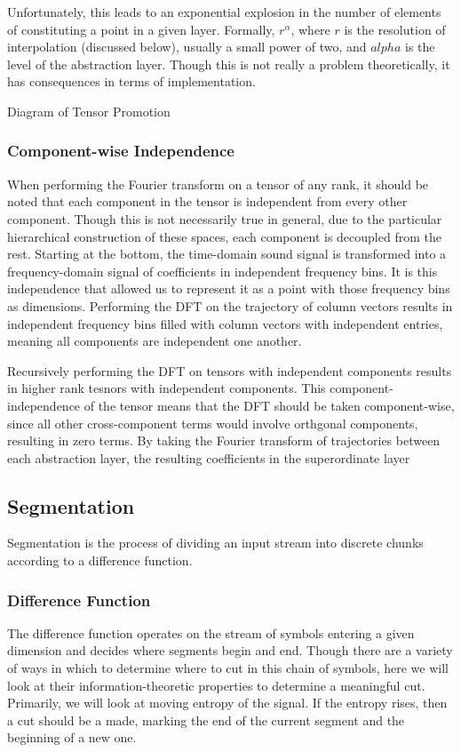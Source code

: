 \documentclass[runningheads]{llncs}
\begin{document}
Unfortunately, this leads to an exponential explosion in the number of elements of constituting a point in a given layer.  Formally, $r^\alpha$, where $r$ is the resolution of interpolation (discussed below), usually a small power of two, and $alpha$ is the level of the abstraction layer.  Though this is not really a problem theoretically, it has consequences in terms of implementation.

Diagram of Tensor Promotion

\subsubsection{Component-wise Independence}

When performing the Fourier transform on a tensor of any rank, it should be noted that each component in the tensor is independent from every other component.  Though this is not necessarily true in general, due to the particular hierarchical construction of these spaces, each component is decoupled from the rest.  Starting at the bottom, the time-domain sound signal is transformed into a frequency-domain signal of coefficients in independent frequency bins.  It is this independence that allowed us to represent it as a point with those frequency bins as dimensions.  Performing the DFT on the trajectory of column vectors results in independent frequency bins filled with column vectors with independent entries, meaning all components are independent one another.

Recursively performing the DFT on tensors with independent components results in higher rank tesnors with independent components.  This component-independence of the tensor means that the DFT should be taken component-wise, since all other cross-component terms would involve orthgonal components, resulting in zero terms.
By taking the Fourier transform of trajectories between each abstraction layer, the resulting coefficients in the superordinate layer 


\subsection{Segmentation}

Segmentation is the process of dividing an input stream into discrete chunks according to a difference function.

\subsubsection{Difference Function}
The difference function operates on the stream of symbols entering a given dimension and decides where segments begin and end.  Though there are a variety of ways in which to determine where to cut in this chain of symbols, here we will look at their information-theoretic properties to determine a meaningful cut. Primarily, we will look at moving entropy of the signal.  If the entropy rises, then a cut should be a made, marking the end of the current segment and the beginning of a new one.
\end{document}
